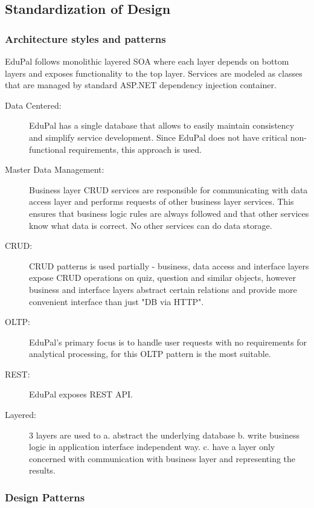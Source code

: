 \subsection{Standardization of Design}

\subsubsection{Architecture styles and patterns}

EduPal follows monolithic layered SOA where each layer depends on bottom layers and exposes functionality to the top layer. Services are modeled as classes that are managed by standard ASP.NET dependency injection container.

\begin{description}
  \item[Data Centered:] EduPal has a single database that allows to easily maintain consistency and simplify service development. Since EduPal does not have critical non-functional requirements, this approach is used.
  \item[Master Data Management:] Business layer CRUD services are responsible for communicating with data access layer and performs requests of other business layer services. This ensures that business logic rules are always followed and that other services know what data is correct. No other services can do data storage.
  \item[CRUD:] CRUD patterns is used partially - business, data access and interface layers expose CRUD operations on quiz, question and similar objects, however business and interface layers abstract certain relations and provide more convenient interface than just "DB via HTTP".
  \item[OLTP:] EduPal's primary focus is to handle user requests with no requirements for analytical processing, for this OLTP pattern is the most suitable.
  \item[REST:] EduPal exposes REST API.
  \item[Layered:] 3 layers are used to a. abstract the underlying database b. write business logic in application interface independent way. c. have a layer only concerned with communication with business layer and representing the results. 
\end{description}

\subsubsection{Design Patterns}

